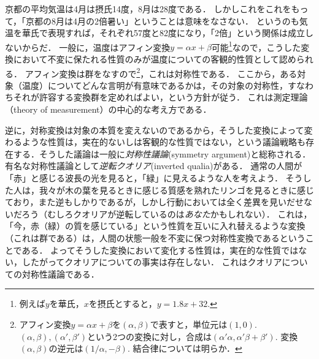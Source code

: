 \documentclass[11pt,a4paper]{jsarticle}
\begin{document}
\begin{example}[有意味性と対称性]
京都の平均気温は4月は摂氏14度，8月は28度である．
しかしこれをこれをもって，「京都の8月は4月の2倍暑い」ということは意味をなさない．
というのも気温を華氏で表現すれば，それぞれ57度と82度になり，「2倍」という関係は成立しないからだ．
一般に，温度はアフィン変換$y = \alpha x + \beta$可能\footnote{例えば$y$を華氏，$x$を摂氏とすると，$y = 1.8x+32$.}なので，こうした変換において不変に保たれる性質のみが温度についての客観的性質として認められる．
アフィン変換は群をなすので\footnote{アフィン変換$y=\alpha x + \beta$を$(\alpha, \beta)$で表すと，単位元は$(1,0)$. $(\alpha, \beta), (\alpha',\beta')$という2つの変換に対し，合成は$(\alpha' \alpha, \alpha' \beta + \beta')$. 変換$(\alpha, \beta)$の逆元は$(1/\alpha, -\beta)$. 結合律については明らか．}，これは対称性である．
ここから，ある対象（温度）についてどんな言明が有意味であるかは，その対象の対称性，すなわちそれが許容する変換群を定めればよい，という方針が従う．
これは測定理論（theory of measurement）の中心的な考え方である\citep[e.g,][]{Narens2007-ty}．
\end{example}


\begin{example} 
逆に，対称変換は対象の本質を変えないのであるから，そうした変換によって変わるような性質は，実在的ないしは客観的な性質ではない，という議論戦略も存在する．そうした議論は一般に\emph{対称性議論}(symmetry argument)と総称される．
有名な対称性議論として\emph{逆転クオリア}(inverted qualia)がある．
通常の人間が「赤」と感じる波長の光を見ると，「緑」に見えるような人を考えよう．
そうした人は，我々が木の葉を見るときに感じる質感を熟れたリンゴを見るときに感じており，また逆もしかりであるが，しかし行動においては全く差異を見いだせないだろう（むしろクオリアが逆転しているのは\emph{あなた}かもしれない）．
これは，「今，赤（緑）の質を感じている」という性質を互いに入れ替えるような変換（これは群である）は，人間の状態一般を不変に保つ対称性変換であるということである．
よってそうした変換において変化する性質は，実在的な性質ではない，したがってクオリアについての事実は存在しない．
これはクオリアについての対称性議論である．
\end{example}
\end{document}

